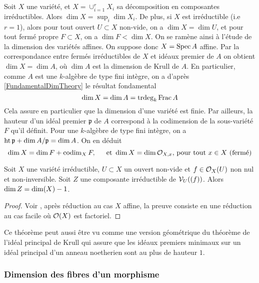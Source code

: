 Soit $X$ une variété, et $X=\cup_{i=1}^rX_i$ sa décomposition en composantes irréductibles. Alors $\dim X=\sup_i \dim X_i$. De plus, si $X$ est irréductible (i.e $r=1$), alors pour tout ouvert $U\subset X$ non-vide, on a $\dim X=\dim U$, et pour tout fermé propre $F\subset X$, on a $\dim F<\dim X$. On se ramène ainsi à l'étude de la dimension des variétés affines. On suppose donc $X=\operatorname{Spec} A$ affine. Par la correspondance entre fermés irréductibles de $X$ et idéaux premier de $A$ on obtient $\dim X= \dim A$, où $\dim A$ est la dimension de Krull de $A$. En particulier, comme $A$ est une $k$-algèbre de type fini intègre, on a d'après \ref{FundamentalDimTheory} le résultat fondamental
$$\dim X=\dim A=\operatorname{trdeg}_k \operatorname{Frac} A$$
Cela assure en particulier que la dimension d'une variété est finie. Par ailleurs, la hauteur d'un idéal premier $\mathfrak{p}$ de $A$ correspond à la codimension de la sous-variété $F$ qu'il définit. Pour une $k$-algèbre de type fini intègre, on a $\operatorname{ht} \mathfrak{p}+ \dim A/\mathfrak{p}=\dim A$. On en déduit
$$\dim X=\dim F+\operatorname{codim}_X F,\,\,\,\,\,\,\, \text{ et } \dim X=\dim\mathcal{O}_{X,x} \text{, pour tout } x\in X \text{ (fermé)}$$

\begin{thm}\label{dimsousvariete}
Soit $X$ une variété irréductible, $U\subset X$ un ouvert non-vide et $f\in \mathcal{O}_X(U)$ non nul et non-inversible. Soit $Z$ une composante irréductible de $\mathcal{V}_U((f))$. Alors $\operatorname{dim} Z= \operatorname{dim}(X)-1$.
\end{thm}
\begin{proof}
Voir \cite[I.7 Th.2]{MumfordRedBook}, après réduction au cas $X$ affine, la preuve consiste en une réduction au cas facile où $\mathcal{O}(X)$ est factoriel. 
\end{proof}

Ce théorème peut aussi être vu comme une version géométrique du théorème de l'idéal principal de Krull qui assure que les idéaux premiers minimaux sur un idéal principal d'un anneau noetherien sont au plus de hauteur $1$.

\subsubsection{Dimension des fibres d'un morphisme}


